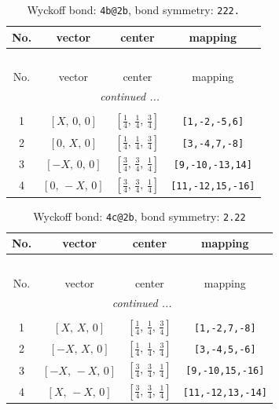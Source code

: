 \documentclass[fleqn,8pt]{jsarticle}
\begin{document}
\begin{longtable}{cccc}
\caption{Wyckoff bond: {\tt 4b@2b}, bond symmetry: {\tt 222.}}
 \\
 \hline \hline
No. & vector & center & mapping \\ \hline \endfirsthead

\multicolumn{3}{l}{\tablename\ \thetable{}} \\
 \hline \hline
No. & vector & center & mapping \\ \hline \endhead

 \hline \hline
\multicolumn{3}{r}{\footnotesize\it continued ...} \\ \endfoot

 \hline \hline
\multicolumn{3}{r}{} \\ \endlastfoot

1 & $\left[ X,\, 0,\, 0 \right]$ & $\left[ \frac{1}{4},\, \frac{1}{4},\, \frac{3}{4} \right]$ & {\tt [1,-2,-5,6]} \\ \hline
2 & $\left[ 0,\, X,\, 0 \right]$ & $\left[ \frac{1}{4},\, \frac{1}{4},\, \frac{3}{4} \right]$ & {\tt [3,-4,7,-8]} \\ \hline
3 & $\left[ - X,\, 0,\, 0 \right]$ & $\left[ \frac{3}{4},\, \frac{3}{4},\, \frac{1}{4} \right]$ & {\tt [9,-10,-13,14]} \\ \hline
4 & $\left[ 0,\, - X,\, 0 \right]$ & $\left[ \frac{3}{4},\, \frac{3}{4},\, \frac{1}{4} \right]$ & {\tt [11,-12,15,-16]} \\
\end{longtable}
\renewcommand{\arraystretch}{1.2}
\begin{longtable}{cccc}
\caption{Wyckoff bond: {\tt 4c@2b}, bond symmetry: {\tt 2.22}}
 \\
 \hline \hline
No. & vector & center & mapping \\ \hline \endfirsthead

\multicolumn{3}{l}{\tablename\ \thetable{}} \\
 \hline \hline
No. & vector & center & mapping \\ \hline \endhead

 \hline \hline
\multicolumn{3}{r}{\footnotesize\it continued ...} \\ \endfoot

 \hline \hline
\multicolumn{3}{r}{} \\ \endlastfoot

1 & $\left[ X,\, X,\, 0 \right]$ & $\left[ \frac{1}{4},\, \frac{1}{4},\, \frac{3}{4} \right]$ & {\tt [1,-2,7,-8]} \\ \hline
2 & $\left[ - X,\, X,\, 0 \right]$ & $\left[ \frac{1}{4},\, \frac{1}{4},\, \frac{3}{4} \right]$ & {\tt [3,-4,5,-6]} \\ \hline
3 & $\left[ - X,\, - X,\, 0 \right]$ & $\left[ \frac{3}{4},\, \frac{3}{4},\, \frac{1}{4} \right]$ & {\tt [9,-10,15,-16]} \\ \hline
4 & $\left[ X,\, - X,\, 0 \right]$ & $\left[ \frac{3}{4},\, \frac{3}{4},\, \frac{1}{4} \right]$ & {\tt [11,-12,13,-14]} \\
\end{longtable}
\end{document}
